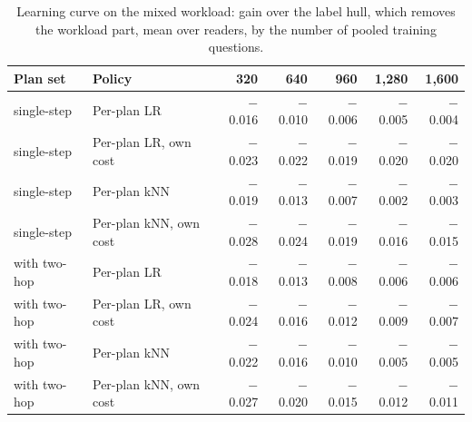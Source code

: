 \begin{table}[t]
\centering\small
\setlength{\tabcolsep}{4pt}
\caption{Learning curve on the mixed workload: gain over the label hull, which removes the workload part, mean over readers, by the number of pooled training questions.}
\label{tab:extra_curve}
\begin{tabular*}{\linewidth}{@{\extracolsep{\fill}}llrrrrr}
\toprule
Plan set & Policy & 320 & 640 & 960 & 1,280 & 1,600 \\
\midrule
single-step & Per-plan LR & $-$0.016 & $-$0.010 & $-$0.006 & $-$0.005 & $-$0.004 \\
single-step & Per-plan LR, own cost & $-$0.023 & $-$0.022 & $-$0.019 & $-$0.020 & $-$0.020 \\
single-step & Per-plan kNN & $-$0.019 & $-$0.013 & $-$0.007 & $-$0.002 & $-$0.003 \\
single-step & Per-plan kNN, own cost & $-$0.028 & $-$0.024 & $-$0.019 & $-$0.016 & $-$0.015 \\
with two-hop & Per-plan LR & $-$0.018 & $-$0.013 & $-$0.008 & $-$0.006 & $-$0.006 \\
with two-hop & Per-plan LR, own cost & $-$0.024 & $-$0.016 & $-$0.012 & $-$0.009 & $-$0.007 \\
with two-hop & Per-plan kNN & $-$0.022 & $-$0.016 & $-$0.010 & $-$0.005 & $-$0.005 \\
with two-hop & Per-plan kNN, own cost & $-$0.027 & $-$0.020 & $-$0.015 & $-$0.012 & $-$0.011 \\
\bottomrule
\end{tabular*}
\end{table}
